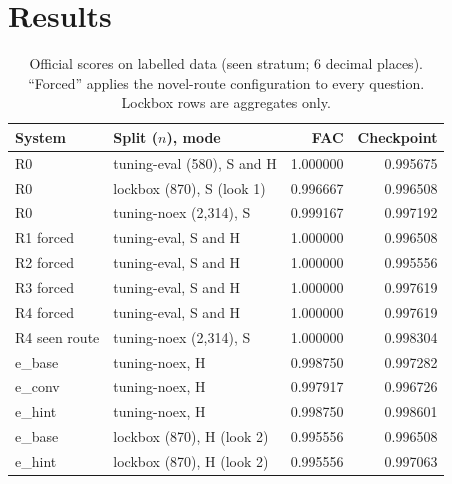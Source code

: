 \documentclass[conference]{IEEEtran}
\begin{document}
\section{Results}\label{sec:results}
\begin{table}[t]
\caption{Official scores on labelled data (seen stratum; 6 decimal places). ``Forced'' applies the novel-route configuration to every question. Lockbox rows are aggregates only.}
\label{tab:labelled}
\centering
\scriptsize
\begin{tabular}{@{}llrr@{}}
\toprule
System & Split ($n$), mode & FAC & Checkpoint \\
\midrule
R0 & tuning-eval (580), S and H & 1.000000 & 0.995675 \\
R0 & lockbox (870), S (look 1) & 0.996667 & 0.996508 \\
R0 & tuning-noex (2,314), S & 0.999167 & 0.997192 \\
R1 forced & tuning-eval, S and H & 1.000000 & 0.996508 \\
R2 forced & tuning-eval, S and H & 1.000000 & 0.995556 \\
R3 forced & tuning-eval, S and H & 1.000000 & 0.997619 \\
R4 forced & tuning-eval, S and H & 1.000000 & 0.997619 \\
R4 seen route & tuning-noex (2,314), S & 1.000000 & 0.998304 \\
\midrule
e\_base & tuning-noex, H & 0.998750 & 0.997282 \\
e\_conv & tuning-noex, H & 0.997917 & 0.996726 \\
e\_hint & tuning-noex, H & 0.998750 & 0.998601 \\
e\_base & lockbox (870), H (look 2) & 0.995556 & 0.996508 \\
e\_hint & lockbox (870), H (look 2) & 0.995556 & 0.997063 \\
\bottomrule
\end{tabular}
\end{table}
\end{document}
